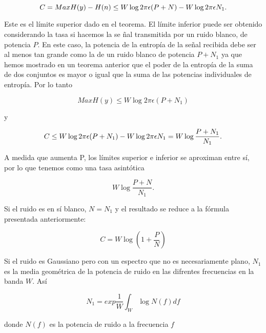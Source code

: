 	\begin{equation}
		C = Max H(y) - H(n)\bigskip
		\leq W\log 2\pi\epsilon (P+N) - W\log 2\pi \epsilon N_{1}.
	\end{equation}
	
	Este es el l\'imite superior dado en el teorema. El l\'imite inferior puede ser obtenido
	considerando la tasa si hacemos la se \~nal transmitida por un ruido blanco, de potencia
	$P$. En este caso, la potencia de la entrop\'ia de la se\~nal  recibida debe  ser al menos
	tan grande como la de un ruido blanco de potencia $P + N_{1}$ ya que hemos mostrado
	en un teorema anterior que el poder de la entrop\'ia de la suma de dos conjuntos es 
	mayor o igual que la suma de las potencias individuales de entrop\'ia. Por lo tanto
	
	\begin{equation}
		Max H(y) \leq W\log 2\pi \epsilon(P+N_{1})
	\end{equation}
	
	
	y
	
	\begin{equation}
		C \leq W\log 2\pi \epsilon (P + N_{1}) - W\log 2 \pi \epsilon N_{1} \bigskip
		= W\log \frac{P+N_{1}}{N_{1}}.
	\end{equation}
	
	A medida que aumenta P, los l\'imites superior e inferior se aproximan entre s\'i, por
	lo que tenemos como una tasa asint\'otica
	
	\begin{equation}
		W\log \frac{P+N}{N_{1}}.
	\end{equation}
	
	Si el ruido es en s\'i blanco, $N = N_{1}$ y el resultado se reduce a la f\'ormula 
	presentada anteriormente:
	
	\begin{equation}
		C = W\log (1 + \frac{P}{N})
	\end{equation}
	
	Si el ruido es Gaussiano pero con un espectro que no es necesariamente plano, $N_{1}$
	es la media geom\'etrica de la potencia  de ruido en las difrentes frecuencias en la 
	banda $W$. As\'i
	
	\begin{equation}
		N_{1} = exp \frac{1}{W} \int_W \log N(f)df
	\end{equation}
	
	donde $N(f)$ es la potencia de ruido a la frecuencia $f$
	\bigskip
	
